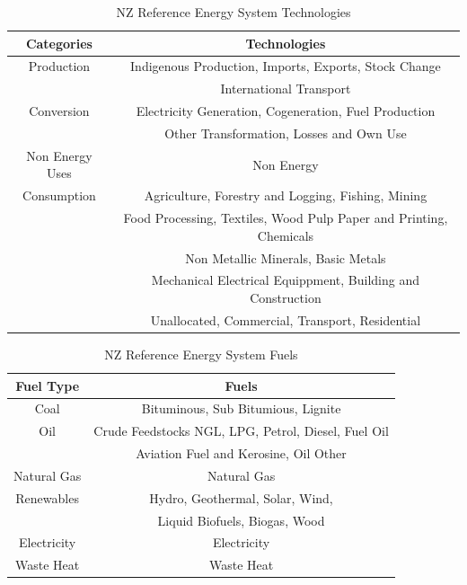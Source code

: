 \documentclass[12pt]{article}
\begin{document}
\begin{table}[H]
	\centering
	\begin{tabular}{||c | c||} 
	 \hline
	 Categories & Technologies \\ [0.5ex] 
	 \hline\hline
	 Production & Indigenous Production, Imports, Exports, Stock Change\\
	 & International Transport\\ 
	 \hline  
	 Conversion & Electricity Generation, Cogeneration, Fuel Production \\
	 & Other Transformation, Losses and Own Use\\
	 \hline
	 Non Energy Uses & Non Energy \\
	 \hline
	 Consumption& Agriculture, Forestry and Logging, Fishing, Mining \\
	 &Food Processing, Textiles, Wood Pulp Paper and Printing, Chemicals\\
	 &Non Metallic Minerals, Basic Metals\\
	 &Mechanical Electrical Equippment, Building and Construction\\
	 &Unallocated, Commercial, Transport, Residential\\
	 \hline
	\end{tabular}
	\caption{NZ Reference Energy System Technologies}
	\label{table:2}
\end{table}
\begin{table}[H]
	\centering
	\begin{tabular}{||c | c||} 
	 \hline
	 Fuel Type & Fuels \\ [0.5ex] 
	 \hline\hline
	 Coal & Bituminous, Sub Bitumious, Lignite\\
	 \hline
	 Oil & Crude Feedstocks NGL, LPG, Petrol, Diesel, Fuel Oil\\
	 & Aviation Fuel and Kerosine, Oil Other\\
	 \hline
	 Natural Gas & Natural Gas\\
	 \hline 
	 Renewables & Hydro, Geothermal, Solar, Wind, \\
	 & Liquid Biofuels, Biogas, Wood\\
	 \hline
	 Electricity & Electricity\\
	 \hline
	 Waste Heat & Waste Heat\\
	 \hline
	\end{tabular}
	\caption{NZ Reference Energy System Fuels}
	\label{table:3}
\end{table}
\end{document}
